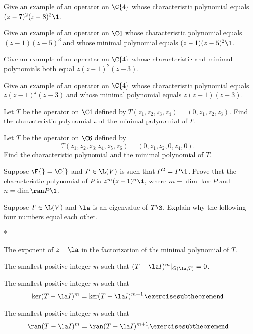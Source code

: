 \exercise
Give an example of an operator on $\C{4}$ whose characteristic
polynomial equals $(z - 7)^2 (z - 8)^2\1$.


\exercise
Give an example of an operator on $\C4$ whose characteristic
polynomial equals $(z - 1) (z - 5)^3$ and whose minimal polynomial equals
$(z - 1) (z - 5)^2\1$.


\exercise
Give an example of an operator on $\C{4}$ whose characteristic and
minimal polynomials both equal $z (z - 1)^2 (z - 3)$.


\exercise
Give an example of an operator on $\C{4}$ whose characteristic
polynomial equals $z (z - 1)^2 (z - 3)$ and whose minimal polynomial equals
$z (z - 1) (z - 3)$.

\exercise
Let $T$ be the operator on $\C4$ defined by
$
T(z_1, z_2, z_3, z_4) = (0, z_1, z_2, z_3)$.
Find the characteristic polynomial and the minimal polynomial of $T$.


\exercise
Let $T$ be the operator on $\C6$ defined by
\[
T(z_1, z_2, z_3, z_4, z_5, z_6) = (0, z_1, z_2, 0, z_4, 0).
\]
Find the characteristic polynomial and the minimal polynomial of $T$.


\exercise
Suppose $\F{} = \C{}$ and $P \in \L(V)$ is such that $P^2 = P\1$. Prove that the characteristic polynomial of $P$ is $z^m (z-1)^n\1$, where $m = \dim \ker P$ and $n = \dim \ran P\1$.\label{8P2}


\exercise
Suppose $T \in \L(V)$ and $\la$ is an eigenvalue of $T\3$. Explain why the following four numbers equal each other.
\begin{subtheorem}*
\item
The exponent of $z-\la$ in the factorization of the minimal polynomial of $T$.
\item
The smallest positive integer $m$ such that $(T - \la I)^m|_{G(\la, T)} = 0$.
\item
The smallest positive integer $m$ such that
\[
\ker (T - \la I)^m = \ker (T - \la I)^{m+1}\!.
\exercisesubtheoremend
\]
\item
The smallest positive integer $m$ such that
\[
\ran (T - \la I)^m = \ran (T - \la I)^{m+1}\!.
\exercisesubtheoremend
\]
\end{subtheorem}
\exercisesubtheoremend


